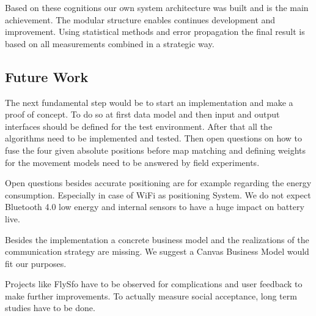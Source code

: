 Based on these cognitions our own system architecture was built and is the main achievement. The modular structure enables continues development and improvement. Using statistical methods and error propagation the final result is based on all measurements combined in a strategic way.



\subsection{Future Work}
The next fundamental step would be to start an implementation and make a proof of concept. To do so at first data model and then input and output interfaces should be defined for the test environment. After that all the algorithms need to be implemented and tested. Then open questions on how to fuse the four given absolute positions before map matching and defining weights for the movement models need to be answered by field experiments. 

Open questions besides accurate positioning are for example regarding the energy consumption. Especially in case of WiFi as positioning System. We do not expect Bluetooth 4.0 low energy and internal sensors to have a huge impact on battery live. 

Besides the implementation a concrete business model and the realizations of the communication strategy are missing. We suggest a Canvas Business Model would fit our purposes. 

Projects like FlySfo have to be observed for complications and user feedback to make further improvements. To actually measure social acceptance, long term studies have to be done. 


